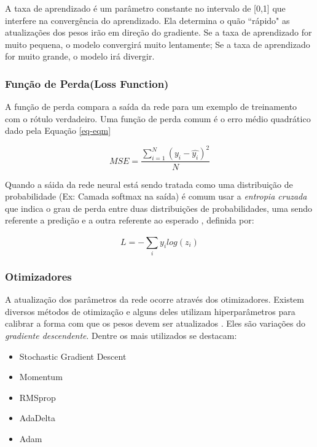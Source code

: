 A taxa de aprendizado é um parâmetro constante no intervalo de [0,1] que interfere na convergência do aprendizado. Ela determina o quão ``rápido" as atualizações dos pesos irão em direção do gradiente. Se a taxa de aprendizado for muito pequena, o modelo convergirá muito lentamente; Se a taxa de aprendizado for muito grande, o modelo irá divergir. 

\subsubsection{Função de Perda(Loss Function)}
A função de perda compara a saída da rede para um exemplo de treinamento com o rótulo verdadeiro. Uma função de perda comum é o erro médio quadrático dado pela Equação \ref{eq-eqm}

	\begin{equation} \label{eq-eqm}
MSE = 	\frac{ \sum_{i=1}^{N} (y_i - \hat{y_i})^2}{N}
\end{equation}

Quando a sáida da rede neural está sendo tratada como uma distribuição de probabilidade (Ex: Camada softmax na saída) é comum usar a \textit{entropia cruzada} que indica o grau de perda entre duas distribuições de probabilidades, uma sendo referente a predição e a outra referente ao esperado , definida por:

\begin{equation}
L = - \sum_{i}^{} y_i log(z_i)
\end{equation}

\subsubsection{Otimizadores}
A atualização dos parâmetros da rede ocorre através dos otimizadores. Existem diversos métodos de otimização e alguns deles utilizam hiperparâmetros para calibrar a forma com que os pesos devem ser atualizados . Eles são variações do \textit{gradiente descendente}. Dentre os mais utilizados se destacam: 

\begin{itemize}
	\item Stochastic Gradient Descent
	\item Momentum
	\item RMSprop
	\item AdaDelta
	\item Adam
\end{itemize}



